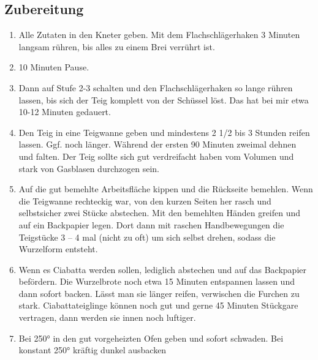 \subsection*{Zubereitung}
\begin{enumerate}
   \item Alle Zutaten in den Kneter geben. Mit dem Flachschlägerhaken  3 Minuten langsam rühren, bis alles zu einem Brei verrührt ist.
   \item 10 Minuten Pause.
   \item Dann auf Stufe 2-3 schalten und den Flachschlägerhaken so lange rühren lassen, bis sich der Teig komplett von der Schüssel löst. Das hat bei mir etwa 10-12 Minuten gedauert.
   \item Den Teig in eine Teigwanne geben und mindestens 2 1/2 bis 3 Stunden reifen lassen. Ggf. noch länger. Während der ersten 90 Minuten zweimal dehnen und falten. Der Teig sollte sich gut verdreifacht haben vom Volumen und stark von Gasblasen durchzogen sein.
   \item Auf die gut bemehlte Arbeitsfläche kippen und die Rückseite bemehlen. Wenn die Teigwanne rechteckig war, von den kurzen Seiten her rasch und selbstsicher zwei Stücke abstechen. Mit den bemehlten Händen greifen und auf ein Backpapier legen. Dort dann mit raschen Handbewegungen die Teigstücke 3 – 4 mal (nicht zu oft) um sich selbst drehen, sodass die Wurzelform entsteht.
   \item Wenn es Ciabatta werden sollen, lediglich abstechen und auf das Backpapier befördern. Die Wurzelbrote noch etwa 15 Minuten entspannen lassen und dann sofort backen. Lässt man sie länger reifen, verwischen die Furchen zu stark. Ciabattateiglinge können noch gut und gerne 45 Minuten Stückgare vertragen, dann werden sie innen noch luftiger.
   \item Bei 250° in den gut vorgeheizten Ofen geben und sofort schwaden. Bei konstant 250° kräftig dunkel ausbacken
\end{enumerate}
 
